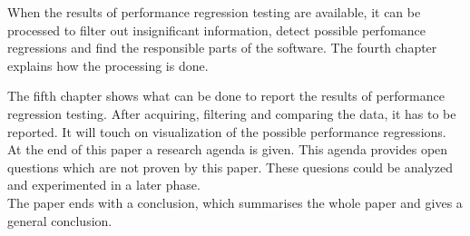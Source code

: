 When the results of performance regression testing are available, it can be processed to filter out insignificant information, detect possible perfomance regressions and find the responsible parts of the software. The fourth chapter explains how the processing is done. 

The fifth chapter shows what can be done to report the results of performance regression testing. After acquiring, filtering and comparing the data, it has to be reported. It will touch on visualization of the possible performance regressions. \\

At the end of this paper a research agenda is given. This agenda provides open questions which are not proven by this paper. These quesions could be analyzed and experimented in a later phase. \\
The paper ends with a conclusion, which summarises the whole paper and gives a general conclusion. 
